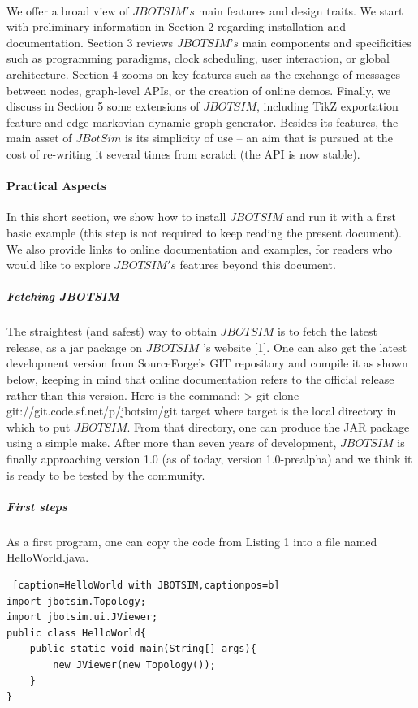 \paragraph{}We offer a broad view of $JBOTSIM's$ main features and design traits. We start with preliminary information in Section 2 regarding installation and documentation. Section 3 reviews $JBOTSIM’s$ main components and specificities such as programming paradigms, clock scheduling, user interaction, or global architecture. Section 4 zooms on key features such as the exchange of messages between nodes, graph-level APIs, or the creation of online demos. Finally, we discuss in Section 5 some extensions of $JBOTSIM$, including TikZ exportation feature and edge-markovian dynamic graph generator. Besides its features, the main asset of $JBotSim$ is its simplicity of use – an aim that is pursued at the cost of re-writing it several times from scratch (the API is now stable).
\paragraph{Practical Aspects}In this short section, we show how to install $JBOTSIM$ and run it with a first basic example (this step is not required to keep reading the present document). We also provide links to online documentation and examples, for readers who would like to explore $JBOTSIM's$ features beyond this document.
\subparagraph{Fetching JBOTSIM}The straightest (and safest) way to obtain $JBOTSIM$ is to fetch the latest release, as a jar package on  $JBOTSIM$ ’s website [1]. One can also get the latest development version from SourceForge’s GIT repository and compile it as shown below, keeping in mind that online documentation refers to the official release rather than this version. Here is the command:
\newline
> git clone git://git.code.sf.net/p/jbotsim/git target
\newline
where target is the local directory in which to put $JBOTSIM$. From that directory, one can produce the JAR package using a simple make. After more than seven years of development, $JBOTSIM$ is finally approaching version 1.0 (as of today, version 1.0-prealpha) and we think it is ready to be tested by the community.
\subparagraph{First steps}As a first program, one can copy the code from Listing 1 into a file named HelloWorld.java.
\newpage
\begin{lstlisting} [caption=HelloWorld with JBOTSIM,captionpos=b]
import jbotsim.Topology;
import jbotsim.ui.JViewer;
public class HelloWorld{
	public static void main(String[] args){
		new JViewer(new Topology());
	} 
}
\end{lstlisting}

